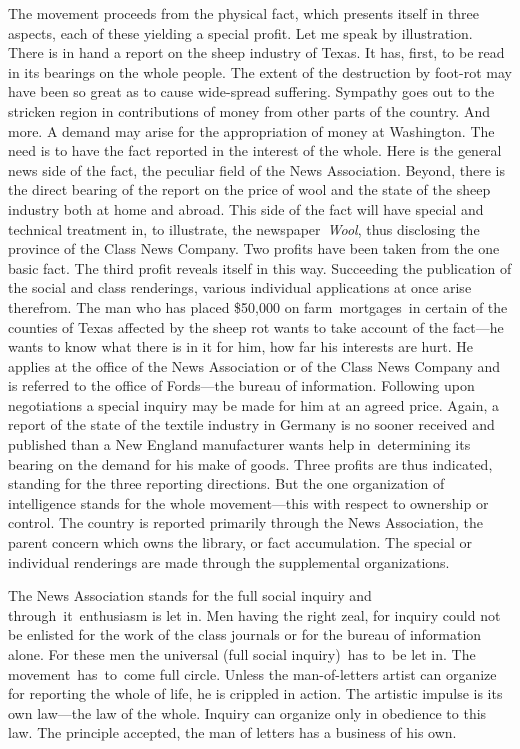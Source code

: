 \documentclass[twoside,symmetric,nobib,justified]{tufte-book}
\begin{document}
The movement proceeds from the physical fact, which presents itself in
three aspects, each of these yielding a special profit. Let me speak by
illustration. There is in hand a report on the sheep industry of Texas.
It has, first, to be read in its bearings on the whole people. The
extent of the destruction by foot-rot may have been so great as to cause
wide-spread suffering. Sympathy goes out to the stricken region in
contributions of money from other parts of the country. And more. A
demand may arise for the appropriation of money at Washington. The need
is to have the fact reported in the interest of the whole. Here is the
general news side of the fact, the peculiar field of the News
Association. Beyond, there is the direct bearing of the report on the
price of wool and the state of the sheep industry both at home and
abroad. This side of the fact will have special and technical treatment
in, to illustrate, the newspaper~\emph{Wool}, thus disclosing the
province of the Class News Company. Two profits have been taken from the
one basic fact. The third profit reveals itself in this way. Succeeding
the publication of the social and class renderings, various individual
applications at once arise therefrom. The man who has placed \$50,000 on
farm~mortgages~in certain of the counties of Texas affected by the sheep
rot wants to take account of the fact---he wants to know what there is
in it for him, how far his interests are hurt. He applies at the office
of the News Association or of the Class News Company and is referred to
the office of Fords---the bureau of information. Following upon
negotiations a special inquiry may be made for him at an agreed price.
Again, a report of the state of the textile industry in Germany is no
sooner received and published than a New England manufacturer wants help
in~determining its bearing on the demand for his make of goods. Three
profits are thus indicated, standing for the three reporting directions.
But the one organization of intelligence stands for the whole
movement---this with respect to ownership or control. The country is
reported primarily through the News Association, the parent concern
which owns the library, or fact accumulation. The special or individual
renderings are made through the supplemental organizations.~

The News Association stands for the full social inquiry and
through~it~enthusiasm is let in. Men having the right zeal, for inquiry
could not be enlisted for the work of the class journals or for the
bureau of information alone. For these men the universal (full social
inquiry)~has to~be let in. The movement~has~to~come full circle. Unless
the man-of-letters artist can organize for reporting the whole of life,
he is crippled in action. The artistic impulse is its own law---the law
of the whole. Inquiry can organize only in obedience to this law. The
principle accepted, the man of letters has a business of his own.~
\end{document}
